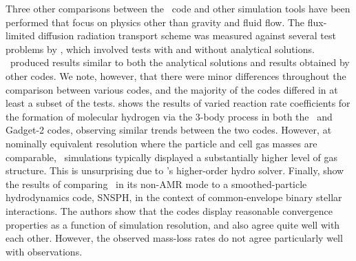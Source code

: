 Three other comparisons between the \enzo\ code and other simulation
tools have been performed that focus on physics other than gravity and
fluid flow.  The flux-limited diffusion radiation transport scheme was
measured against several test problems by \citet{IlievEtAl2009},
which involved tests with and without analytical solutions.  \enzo\ produced
results similar to both the analytical solutions and results obtained by 
other codes.  We note, however, that there were minor differences throughout
the comparison between various codes, and the majority of the codes differed
in at least a subset of the tests.
\citet{2011ApJ...726...55T} shows the results of varied reaction rate
coefficients for the formation of molecular hydrogen via the 3-body
process in both the \enzo\ and Gadget-2 codes, observing similar trends between
the two codes. However, at nominally equivalent resolution
where the particle and cell gas masses are comparable, 
\enzo\ simulations typically displayed a
substantially higher level of gas structure.  This is unsurprising due
to \enzo's higher-order hydro solver.  Finally,
\citet{2012ApJ...744...52P} show the results of comparing \enzo\ in
its non-AMR mode to a smoothed-particle hydrodynamics code, SNSPH, in
the context of common-envelope binary stellar interactions.  The
authors show that the codes display reasonable convergence properties
as a function of simulation resolution, and also agree quite well with
each other. However, the observed mass-loss rates do not agree
particularly well with observations.
